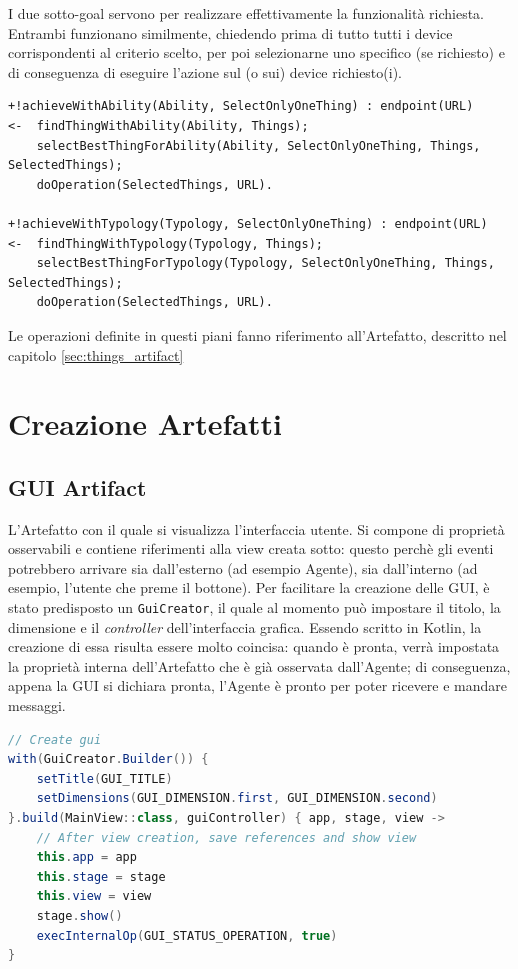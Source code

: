\documentclass[12pt,a4paper,openright,oneside]{report}
\begin{document}
I due sotto-goal servono per realizzare effettivamente la funzionalità richiesta. Entrambi funzionano similmente, chiedendo prima di tutto tutti i device corrispondenti al criterio scelto, per poi selezionarne uno specifico (se richiesto) e di conseguenza di eseguire l'azione sul (o sui) device richiesto(i).

\begin{lstlisting}
+!achieveWithAbility(Ability, SelectOnlyOneThing) : endpoint(URL)
<-  findThingWithAbility(Ability, Things);
	selectBestThingForAbility(Ability, SelectOnlyOneThing, Things, SelectedThings);
	doOperation(SelectedThings, URL).

+!achieveWithTypology(Typology, SelectOnlyOneThing) : endpoint(URL)
<-  findThingWithTypology(Typology, Things);
	selectBestThingForTypology(Typology, SelectOnlyOneThing, Things, SelectedThings);
	doOperation(SelectedThings, URL).
\end{lstlisting}

Le operazioni definite in questi piani fanno riferimento all'Artefatto, descritto nel capitolo \ref{sec:things_artifact}

\section{Creazione Artefatti}

\subsection{GUI Artifact}
\label{sec:gui}
L'Artefatto con il quale si visualizza l'interfaccia utente. Si compone di proprietà osservabili e contiene riferimenti alla view creata sotto: questo perchè gli eventi potrebbero arrivare sia dall'esterno (ad esempio Agente), sia dall'interno (ad esempio, l'utente che preme il bottone). Per facilitare la creazione delle GUI, è stato predisposto un \texttt{GuiCreator}, il quale al momento può impostare il titolo, la dimensione e il \textit{controller} dell'interfaccia grafica. Essendo scritto in Kotlin, la creazione di essa risulta essere molto coincisa: quando è pronta, verrà impostata la proprietà interna dell'Artefatto che è già osservata dall'Agente; di conseguenza, appena la GUI si dichiara pronta, l'Agente è pronto per poter ricevere e mandare messaggi.

\begin{lstlisting}[language=Java]
// Create gui
with(GuiCreator.Builder()) {
	setTitle(GUI_TITLE)
	setDimensions(GUI_DIMENSION.first, GUI_DIMENSION.second)
}.build(MainView::class, guiController) { app, stage, view ->
	// After view creation, save references and show view
	this.app = app
	this.stage = stage
	this.view = view
	stage.show()
	execInternalOp(GUI_STATUS_OPERATION, true)
}
\end{lstlisting}
\end{document}
